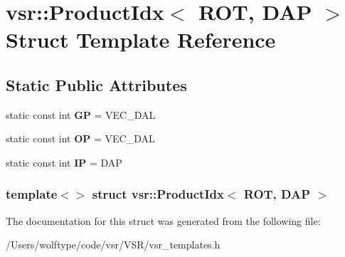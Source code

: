 \hypertarget{structvsr_1_1_product_idx_3_01_r_o_t_00_01_d_a_p_01_4}{\section{vsr\-:\-:Product\-Idx$<$ R\-O\-T, D\-A\-P $>$ Struct Template Reference}
\label{structvsr_1_1_product_idx_3_01_r_o_t_00_01_d_a_p_01_4}
}
\subsection*{Static Public Attributes}
\begin{DoxyCompactItemize}
\item 
\hypertarget{structvsr_1_1_product_idx_3_01_r_o_t_00_01_d_a_p_01_4_a2c6c7f324783651461eea454b3e488f7}{static const int {\bfseries G\-P} = V\-E\-C\-\_\-\-D\-A\-L}\label{structvsr_1_1_product_idx_3_01_r_o_t_00_01_d_a_p_01_4_a2c6c7f324783651461eea454b3e488f7}

\item 
\hypertarget{structvsr_1_1_product_idx_3_01_r_o_t_00_01_d_a_p_01_4_ae91291f8cde2dbba3dbf8d6364ba1212}{static const int {\bfseries O\-P} = V\-E\-C\-\_\-\-D\-A\-L}\label{structvsr_1_1_product_idx_3_01_r_o_t_00_01_d_a_p_01_4_ae91291f8cde2dbba3dbf8d6364ba1212}

\item 
\hypertarget{structvsr_1_1_product_idx_3_01_r_o_t_00_01_d_a_p_01_4_aea9e087c363c03e78909ec3aa5b2250a}{static const int {\bfseries I\-P} = D\-A\-P}\label{structvsr_1_1_product_idx_3_01_r_o_t_00_01_d_a_p_01_4_aea9e087c363c03e78909ec3aa5b2250a}

\end{DoxyCompactItemize}
\subsubsection*{template$<$$>$ struct vsr\-::\-Product\-Idx$<$ R\-O\-T, D\-A\-P $>$}



The documentation for this struct was generated from the following file\-:\begin{DoxyCompactItemize}
\item 
/\-Users/wolftype/code/vsr/\-V\-S\-R/vsr\-\_\-templates.\-h\end{DoxyCompactItemize}

